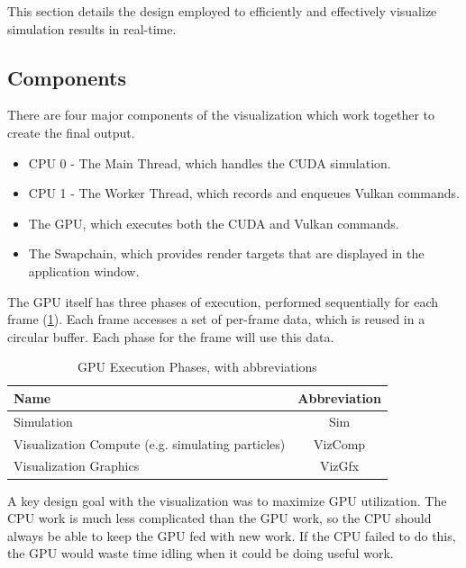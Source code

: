 This section details the design employed to efficiently and effectively visualize simulation results in real-time.

\subsection{Components}
There are four major components of the visualization which work together to create the final output.
\begin{itemize}
    \item CPU 0 - The Main Thread, which handles the CUDA simulation.
    \item CPU 1 - The Worker Thread, which records and enqueues Vulkan commands.
    \item The GPU, which executes both the CUDA and Vulkan commands.
    \item The Swapchain, which provides render targets that are displayed in the application window.
\end{itemize}
The GPU itself has three phases of execution, performed sequentially for each frame (\cref{tab:gpuexecution}).
Each frame accesses a set of per-frame data, which is reused in a circular buffer.
Each phase for the frame will use this data.
\begin{table}[h]
    \centering
    \begin{tabular}{l|c}
    Name & Abbreviation \\
    \hline
    Simulation & Sim \\
    Visualization Compute (e.g. simulating particles) & VizComp \\
    Visualization Graphics & VizGfx \\
    \end{tabular}
    \caption{GPU Execution Phases, with abbreviations}
    \label{tab:gpuexecution}
\end{table}

A key design goal with the visualization was to maximize GPU utilization.
The CPU work is much less complicated than the GPU work, so the CPU should always be able to keep the GPU fed with new work.
If the CPU failed to do this, the GPU would waste time idling when it could be doing useful work.

